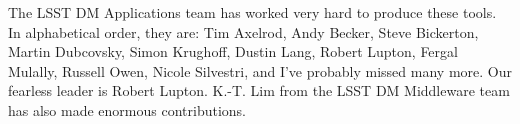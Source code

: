 
The LSST DM Applications team has worked very hard to produce these
tools.  In alphabetical order, they are: Tim Axelrod, Andy Becker,
Steve Bickerton, Martin Dubcovsky, Simon Krughoff, Dustin Lang, Robert
Lupton, Fergal Mulally, Russell Owen, Nicole Silvestri, and I've
probably missed many more.  Our fearless leader is Robert Lupton.
K.-T. Lim from the LSST DM Middleware team has also made enormous
contributions.


